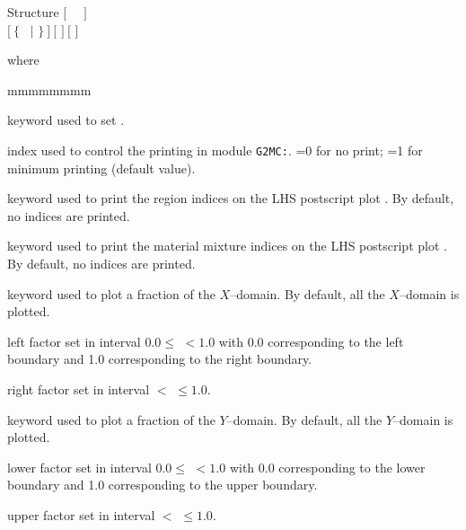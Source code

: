 \vskip -0.5cm

\begin{DataStructure}{Structure }
$[$~ ~$]$ \\
$[~\{$~ $|$  $\}~]~[$    $]~[$    $]$ \\
\moc{;}
\end{DataStructure}

\noindent where
\begin{ListeDeDescription}{mmmmmmmm}

\item[\moc{EDIT}] keyword used to set .

\item[\dusa{iprint}] index used to control the printing in module {\tt G2MC:}. =0 for no print; =1 for minimum printing (default value).

\item[\moc{DRAWNOD}] keyword used to print the region indices on the LHS postscript plot . By default, no indices are printed.

\item[\moc{DRAWMIX}] keyword used to print the material mixture indices on the LHS postscript plot . By default, no indices are printed.

\item[\moc{ZOOMX}] keyword used to plot a fraction of the $X$--domain. By default, all the $X$--domain is plotted.

\item[\dusa{facx1}] left factor set in interval $0.0 \le$  $< 1.0$ with 0.0 corresponding to the left boundary and 1.0 corresponding to the right boundary.

\item[\dusa{facx2}] right factor set in interval  $<$  $\le 1.0$.

\item[\moc{ZOOMY}] keyword used to plot a fraction of the $Y$--domain. By default, all the $Y$--domain is plotted.

\item[\dusa{facy1}] lower factor set in interval  $0.0 \le$  $< 1.0$ with 0.0 corresponding to the lower boundary and 1.0 corresponding to the upper boundary.

\item[\dusa{facy2}] upper factor set in interval  $<$  $\le 1.0$.

\end{ListeDeDescription}

\clearpage
